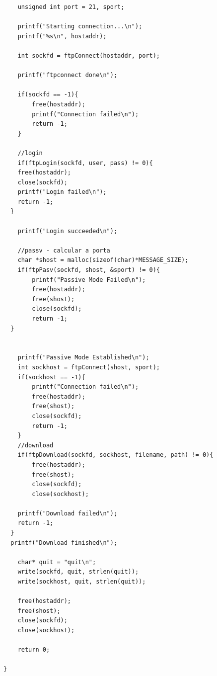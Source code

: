 \documentclass[a4paper]{article}
\begin{document}
\begin{verbatim}
	unsigned int port = 21, sport;

	printf("Starting connection...\n");
	printf("%s\n", hostaddr);

	int sockfd = ftpConnect(hostaddr, port);

	printf("ftpconnect done\n");

	if(sockfd == -1){
		free(hostaddr);
		printf("Connection failed\n");
		return -1;
	}

	//login
	if(ftpLogin(sockfd, user, pass) != 0){
	free(hostaddr);
	close(sockfd);
    printf("Login failed\n");
    return -1;
  }

	printf("Login succeeded\n");

	//passv - calcular a porta
	char *shost = malloc(sizeof(char)*MESSAGE_SIZE);
	if(ftpPasv(sockfd, shost, &sport) != 0){
		printf("Passive Mode Failed\n");
		free(hostaddr);
		free(shost);
		close(sockfd);
		return -1;
  }


	printf("Passive Mode Established\n");
	int sockhost = ftpConnect(shost, sport);
	if(sockhost == -1){
		printf("Connection failed\n");
		free(hostaddr);
		free(shost);
		close(sockfd);
		return -1;
	}
	//download
	if(ftpDownload(sockfd, sockhost, filename, path) != 0){
		free(hostaddr);
		free(shost);
		close(sockfd);
		close(sockhost);

    printf("Download failed\n");
    return -1;
  }
  printf("Download finished\n");

	char* quit = "quit\n";
	write(sockfd, quit, strlen(quit));
	write(sockhost, quit, strlen(quit));

	free(hostaddr);
	free(shost);
	close(sockfd);
	close(sockhost);

	return 0;

}
\end{verbatim}
\end{document}
